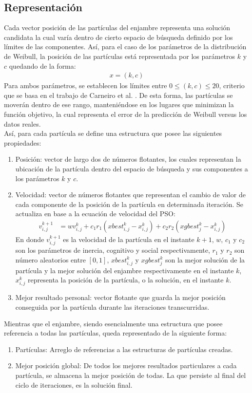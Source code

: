 \subsection{Representación}
Cada vector posición de las partículas del enjambre representa una solución candidata la cual varía dentro de cierto espacio de búsqueda definido por los límites de las componentes. Así, para el caso de los parámetros de la distribución de Weibull, la posición de las partículas está representada por los parámetros $k$ y $c$ quedando de la forma:
\begin{align}
    x = (k, c)
\end{align}    
Para ambos parámetros, se establecen los límites entre $0 \leq (k,c) \leq 20$, criterio que se basa en el trabajo de Carneiro et al. \cite{Carneiro15}. De esta forma, las partículas se moverán dentro de ese rango, manteniéndose en los lugares que minimizan la función objetivo, la cual representa el error de la predicción de Weibull versus los datos reales.\\
Así, para cada partícula se define una estructura que posee las siguientes propiedades: 
\begin{enumerate}\label{rep:Particle}
    \item Posición: vector de largo dos de números flotantes, los cuales representan la ubicación de la partícula dentro del espacio de búsqueda y sus componentes a los parámetros $k$ y $c$.
    \item Velocidad: vector de números flotantes que representan el cambio de valor de cada componente de la posición de la partícula en determinada iteración. Se actualiza en base a la ecuación de velocidad del PSO:
    \begin{align}\label{eq:PSO}
      v_{i,j}^{k+1} &= wv_{i,j}^{k} + c_{1}r_{1}(xbest_{i,j}^k - x_{i,j}^k) + c_{2}r_{2}(xgbest_{j}^{k} - x_{i,j}^k)
    \end{align} 
    En donde $v_{i,j}^{k+1}$ es la velocidad de la partícula en el instante $k+1$, $w$, $c_1$ y $c_2$ son los parámetros de inercia, cognitivo y social respectivamente, $r_{1}$ y $r_{2}$ son número aleatorios entre $[0, 1]$, $xbest_{i,j}^k$ y $xgbest_{j}^{k}$ son la mejor solución de la partícula y la mejor solución del enjambre respectivamente en el instante $k$, $x_{i,j}^k$ representa la posición de la partícula, o la solución, en el instante $k$.    
    \item Mejor resultado personal: vector flotante que guarda la mejor posición conseguida por la partícula durante las iteraciones transcurridas.    
\end{enumerate}        
Mientras que el enjambre, siendo esencialmente una estructura que posee referencia a todas las partículas, queda representado de la siguiente forma:
\begin{enumerate}\label{rep:Swarm}
    \item Partículas: Arreglo de referencias a las estructuras de partículas creadas.
    \item Mejor posición global: De todos los mejores resultados particulares a cada partícula, se almacena la mejor posición de todas. La que persiste al final del ciclo de iteraciones, es la solución final.
\end{enumerate} 

